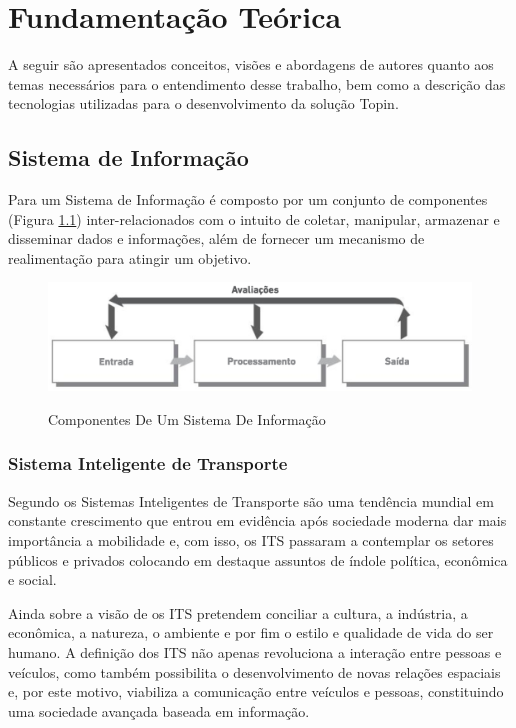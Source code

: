 \chapter{Fundamentação Teórica} \label{cha:fundamentacao}

A seguir são apresentados conceitos, visões e abordagens de autores quanto aos temas necessários para o entendimento desse trabalho, bem como a descrição das tecnologias utilizadas para o desenvolvimento da solução Topin.

\section{Sistema de Informação}

Para  um Sistema de Informação é composto por um conjunto de componentes (Figura \ref{fig:sistema-de-informacao}) inter-relacionados com o intuito de coletar, manipular, armazenar e disseminar dados e informações, além de fornecer um mecanismo de realimentação para atingir um objetivo.

\begin{figure}[H]
\caption{Componentes De Um Sistema De Informação}
\centering
\includegraphics[width=1\textwidth]{imagens/sistema-de-informacao.png}
\label{fig:sistema-de-informacao}
\end{figure}

\subsection{Sistema Inteligente de Transporte}

Segundo  os Sistemas Inteligentes de Transporte são uma tendência mundial em constante crescimento que entrou em evidência após sociedade moderna dar mais importância a mobilidade e, com isso, os ITS passaram a contemplar os setores públicos e privados colocando em destaque assuntos de índole política, econômica e social.

Ainda sobre a visão de  os ITS pretendem conciliar a cultura, a indústria, a econômica, a natureza, o ambiente e por fim o estilo e qualidade de vida do ser humano. A definição dos ITS não apenas revoluciona a interação entre pessoas e veículos, como também possibilita o desenvolvimento de novas relações espaciais e, por este motivo, viabiliza a comunicação entre veículos e pessoas, constituindo uma sociedade avançada baseada em informação. 

